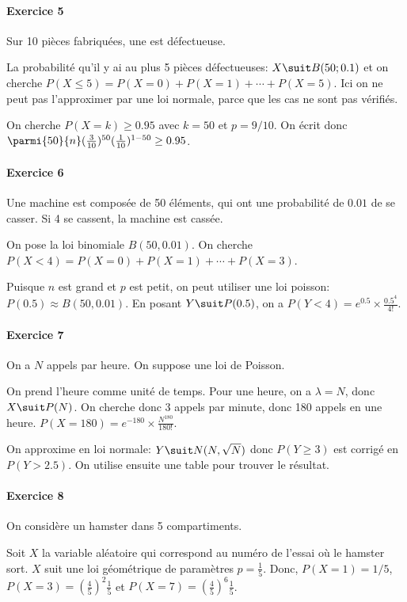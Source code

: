 \documentclass[10pt,a4paper,french]{article}
\begin{document}
\paragraph{Exercice 5}
Sur 10 pièces fabriquées, une est défectueuse.

La probabilité qu'il y ai au plus 5 pièces défectueuses: $X \suit B(50; 0.1)$ et on cherche $P(X \leq 5) = P(X=0) + P(X=1) + \cdots + P(X=5)$. Ici on ne peut pas l'approximer par une loi normale, parce que les cas ne sont pas vérifiés.

On cherche $P(X = k) \geq 0.95$ avec $k = 50$ et $p=9/10$. On écrit donc $\parmi{50}{n} (\frac{3}{10})^{50} (\frac{1}{10})^{1-50} \geq 0.95$.

\paragraph{Exercice 6}
Une machine est composée de 50 éléments, qui ont une probabilité de $0.01$ de se casser. Si 4 se cassent, la machine est cassée.

On pose la loi binomiale $B(50, 0.01)$. On cherche $P(X < 4)=P(X=0) + P(X=1) + \cdots + P(X=3)$.

Puisque $n$ est grand et $p$ est petit, on peut utiliser une loi poisson: $P(0.5) \approx B(50, 0.01)$. En posant $Y \suit P(0.5)$, on a $P(Y < 4) = e^{0.5} \times \frac{0.5^4}{4!}$.

\paragraph{Exercice 7}
On a $N$ appels par heure. On suppose une loi de Poisson.

On prend l'heure comme unité de temps. Pour une heure, on a $\lambda = N$, donc $X \suit P(N)$. On cherche donc 3 appels par minute, donc 180 appels en une heure. $P(X=180)=e^{-180} \times \frac{N^{180}}{180!}$.

On approxime en loi normale: $Y \suit N(N, \sqrt{N})$ donc $P(Y \geq 3)$ est corrigé en $P(Y > 2.5)$. On utilise ensuite une table pour trouver le résultat.

\paragraph{Exercice 8}
On considère un hamster dans 5 compartiments.

Soit $X$ la variable aléatoire qui correspond au numéro de l'essai où le hamster sort. $X$ suit une loi géométrique de paramètres $p = \frac{1}{5}$. Donc, $P(X=1) = 1/5$, $P(X=3) = (\frac{4}{5})^2 \frac{1}{5}$ et $P(X=7) = (\frac{4}{5})^6 \frac{1}{5}$.
\end{document}
